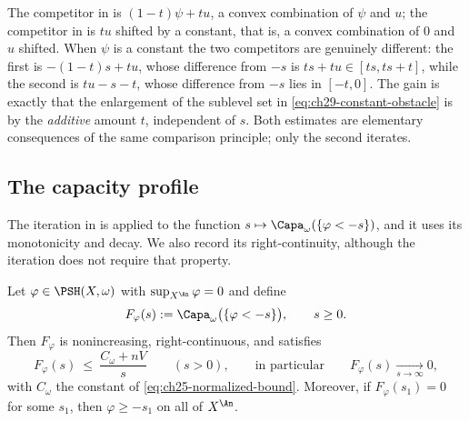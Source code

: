 \begin{remark}
\label{rem:ch29-two-obstacle-forms}
The competitor in  is
$(1-t)\psi+tu$, a convex combination of $\psi$ and $u$; the competitor
in  is $tu$ shifted by a constant, that
is, a convex combination of $0$ and $u$ shifted.  When $\psi$ is a
constant the two competitors are genuinely different: the first is
$-(1-t)s+tu$, whose difference from $-s$ is $ts+tu\in[ts,ts+t]$,
while the second is $tu-s-t$, whose difference from $-s$ lies in $[-t,0]$.  The gain is exactly
that the enlargement of the sublevel set in
\eqref{eq:ch29-constant-obstacle} is by the \emph{additive} amount $t$,
independent of $s$.  Both estimates are elementary consequences of the
same comparison principle; only the second iterates.
\end{remark}

\subsection{The capacity profile}
\label{sec:ch29-profile}

The iteration in  is applied to the function
$s\mapsto\Capa_\omega(\{\varphi<-s\})$, and it uses its monotonicity and decay.  We also record its
right-continuity, although the iteration does not require that property.

\begin{lemma}
\label{lem:ch29-capacity-profile}
Let $\varphi\in\PSH(X,\omega)$ with $\sup_{X^{\An}}\varphi=0$ and define
\begin{equation}
\label{eq:ch29-profile}
 F_\varphi(s):=\Capa_\omega\bigl(\{\varphi<-s\}\bigr),
 \qquad s\geq0 .
\end{equation}
Then $F_\varphi$ is nonincreasing, right-continuous, and satisfies
\begin{equation}
\label{eq:ch29-profile-decay}
 F_\varphi(s)\ \leq\ \frac{C_\omega+nV}{s}\qquad(s>0),
 \qquad\text{in particular}\qquad F_\varphi(s)\xrightarrow[s\to\infty]{}0,
\end{equation}
with $C_\omega$ the constant of \eqref{eq:ch25-normalized-bound}.
Moreover, if $F_\varphi(s_1)=0$ for some $s_1$, then
$\varphi\geq-s_1$ on all of $X^{\An}$.
\end{lemma}

